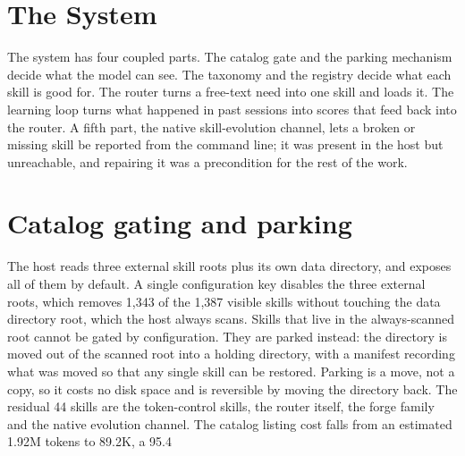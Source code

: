 \documentclass[sigconf,acmsmall]{acmart}
\begin{document}
\section{The System}
The system has four coupled parts. The catalog gate and the parking mechanism decide what the model can see. The taxonomy and the registry decide what each skill is good for. The router turns a free-text need into one skill and loads it. The learning loop turns what happened in past sessions into scores that feed back into the router. A fifth part, the native skill-evolution channel, lets a broken or missing skill be reported from the command line; it was present in the host but unreachable, and repairing it was a precondition for the rest of the work.

\section{Catalog gating and parking}
The host reads three external skill roots plus its own data directory, and exposes all of them by default. A single configuration key disables the three external roots, which removes 1,343 of the 1,387 visible skills without touching the data directory root, which the host always scans.
Skills that live in the always-scanned root cannot be gated by configuration. They are parked instead: the directory is moved out of the scanned root into a holding directory, with a manifest recording what was moved so that any single skill can be restored. Parking is a move, not a copy, so it costs no disk space and is reversible by moving the directory back.
The residual 44 skills are the token-control skills, the router itself, the forge family and the native evolution channel. The catalog listing cost falls from an estimated 1.92M tokens to 89.2K, a 95.4%
\end{document}
